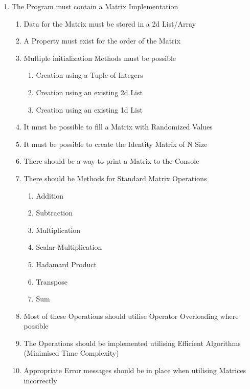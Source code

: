 \begin{flushleft}
\begin{enumerate}
                \item The Program must contain a Matrix Implementation
                \begin{enumerate}
                    \item Data for the Matrix must be stored in a 2d List/Array
                    \item A Property must exist for the order of the Matrix
                    \item Multiple initialization Methods must be possible
                    \begin{enumerate}
                        \item Creation using a Tuple of Integers
                        \item Creation using an existing 2d List
                        \item Creation using an existing 1d List
                    \end{enumerate}
                    \item It must be possible to fill a Matrix with Randomized Values
                    \item It must be possible to create the Identity Matrix of N Size
                    \item There should be a way to print a Matrix to the Console
                    \item There should be Methods for Standard Matrix Operations
                    \begin{enumerate}
                        \item Addition 
                        \item Subtraction
                        \item Multiplication
                        \item Scalar Multiplication
                        \item Hadamard Product
                        \item Transpose
                        \item Sum
                    \end{enumerate}
                    \item Most of these Operations should utilise Operator Overloading where possible
                    \item The Operations should be implemented utilising Efficient Algorithms (Minimised Time Complexity)
                    \item Appropriate Error messages should be in place when utilising Matrices incorrectly
                \end{enumerate}


\end{enumerate}
\end{flushleft}
